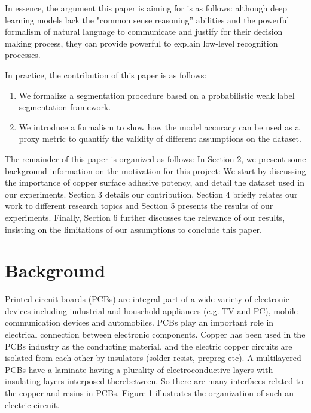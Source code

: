 \documentclass[10pt,twocolumn,letterpaper]{article}
\begin{document}
In essence, the argument this paper is aiming for is as follows: although deep learning models 
lack the "common sense reasoning” abilities and the powerful formalism of natural language to communicate 
and justify for their decision making process, they can provide powerful to explain low-level recognition processes.

In practice, the contribution of this paper is as follows:
\begin{enumerate}
\item  We formalize a segmentation procedure based on a probabilistic weak label segmentation framework.
\item  We introduce a formalism to show how the model accuracy can be used as a proxy metric to quantify the validity of different assumptions
on the dataset.
\end{enumerate}

The remainder of this paper is organized as follows:
In Section 2, we present some background information on the motivation for this project:
We start by discussing the importance of copper surface adhesive potency,
and detail the dataset used in our experiments. 
Section 3 details our contribution.
Section 4 briefly relates our work to different research topics and Section 5 presents the results of our experiments.
Finally, Section 6 further discusses the relevance of our results, insisting on the limitations of our assumptions to conclude this paper.

\section{Background}

Printed circuit boards (PCBs) are integral part of a wide variety of electronic devices including industrial and household appliances (e.g. TV and PC), mobile communication devices and automobiles. PCBs play an important role in electrical connection between electronic components. Copper has been used in the PCBs industry as the conducting material, and the electric copper circuits are isolated from each other by insulators (solder resist, prepreg etc). A multilayered PCBs have a laminate having a plurality of electroconductive layers with insulating layers interposed therebetween. So there are many interfaces related to the copper and resins in PCBs. Figure 1 illustrates the organization of such an electric circuit.
\end{document}
